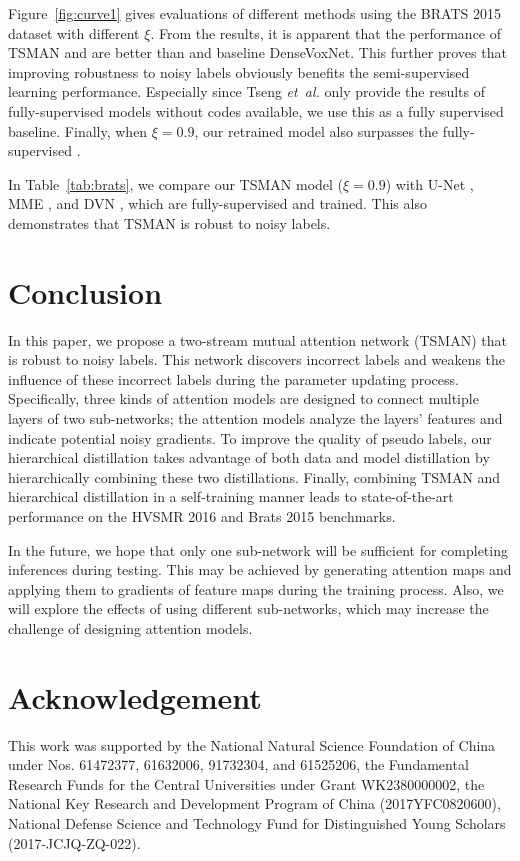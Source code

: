 \documentclass[letterpaper]{article} %
\begin{document}
Figure~\ref{fig:curve1} gives evaluations of different methods using the BRATS 2015 dataset with different $\xi$.
From the results, it is apparent that the performance of TSMAN and \cite{NIPS2017_6697} are better than \cite{Jagersand2017} and baseline DenseVoxNet.
This further proves that improving robustness to noisy labels obviously benefits the semi-supervised learning performance.
Especially since Tseng  \emph{et~al.}\cite{Tseng_2017_CVPR} only provide the results of fully-supervised models without codes available, we use this as a fully supervised baseline.
Finally, when $\xi=0.9$, our retrained model also surpasses the fully-supervised \cite{Tseng_2017_CVPR}.

In Table~\ref{tab:brats}, we compare our TSMAN model ($\xi=0.9$) with U-Net \cite{Ronneberger2015}, MME \cite{Tseng_2017_CVPR}, and DVN \cite{Yu2017}, which are fully-supervised and trained.
This also demonstrates that TSMAN is robust to noisy labels.



\section{Conclusion}
In this paper, we propose a two-stream mutual attention network (TSMAN) that is robust to noisy labels. This network discovers incorrect labels and weakens the influence of these incorrect labels during the parameter updating process.
Specifically, three kinds of attention models are designed to connect multiple layers of two sub-networks; the attention models analyze the layers' features and indicate potential noisy gradients.
To improve the quality of pseudo labels, our hierarchical distillation takes advantage of both data and model distillation by hierarchically combining these two distillations.
Finally, combining TSMAN and hierarchical distillation in a self-training manner leads to state-of-the-art performance on the HVSMR 2016 and Brats 2015 benchmarks.

In the future, we hope that only one sub-network will be sufficient for completing inferences during testing. This may be achieved by generating attention maps and applying them to gradients of feature maps during the training process. 
Also, we will explore the effects of using different sub-networks, which may increase the challenge of designing attention models.

\section{Acknowledgement}
This work was supported by the National Natural Science Foundation of China under Nos. 61472377, 61632006, 91732304, and 61525206, the Fundamental Research Funds for the
Central Universities under Grant WK2380000002, the National Key Research and Development Program of China (2017YFC0820600), National Defense Science and Technology Fund for Distinguished Young Scholars (2017-JCJQ-ZQ-022).



\end{document}
